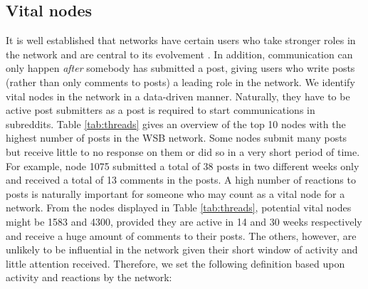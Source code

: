 \subsection{Vital nodes} \label{sec:vn}
It is well established that networks have certain users who take stronger roles in the network and are central to its evolvement \citep{lu2016vital, morone2015influence,bamakan2019opinion, Yang2015}. In addition, communication can only happen \emph{after} somebody has submitted a post, giving users who write posts (rather than only comments to posts) a leading role in the network. 
We identify vital nodes in the network in a data-driven manner. Naturally, they have to be active post submitters as a post is required to start communications in subreddits. %
Table \ref{tab:threads} gives an overview of the top 10 nodes with the highest number of posts in the WSB network. Some nodes submit many posts but receive little to no response on them or did so in a very short period of time. For example, node 1075 submitted a total of 38 posts in two different weeks only and received a total of 13 comments in the posts. A high number of reactions to posts is naturally important for someone who may count as a vital node for a network. From the nodes displayed in Table \ref{tab:threads}, potential vital nodes might be 1583 and 4300, provided they are active in 14 and 30 weeks respectively and receive a huge amount of comments to their posts. The others, however, are unlikely to be influential in the network given their short window of activity and little attention received. Therefore, we set the following definition based upon activity and reactions by the network:

